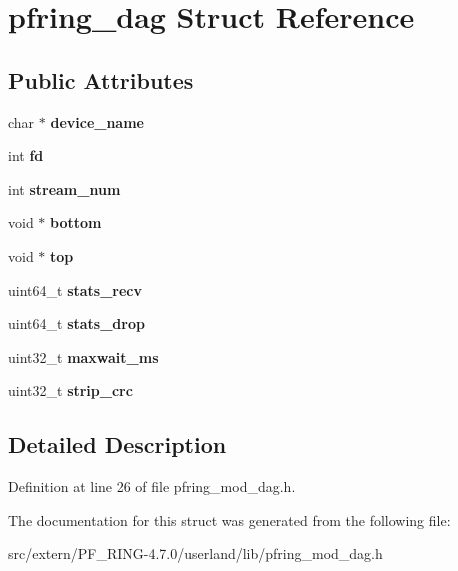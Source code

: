 \hypertarget{structpfring__dag}{
\section{pfring\_\-dag Struct Reference}
\label{structpfring__dag}
}
\subsection*{Public Attributes}
\begin{DoxyCompactItemize}
\item 
\hypertarget{structpfring__dag_aec3de53d9d51010e15cd34fb35ef5f18}{
char $\ast$ {\bfseries device\_\-name}}
\label{structpfring__dag_aec3de53d9d51010e15cd34fb35ef5f18}

\item 
\hypertarget{structpfring__dag_af1bf5f69912c3633f2c62aaaa3fca682}{
int {\bfseries fd}}
\label{structpfring__dag_af1bf5f69912c3633f2c62aaaa3fca682}

\item 
\hypertarget{structpfring__dag_a6955c1d5f98c3b8aa02f37fe305fd8a4}{
int {\bfseries stream\_\-num}}
\label{structpfring__dag_a6955c1d5f98c3b8aa02f37fe305fd8a4}

\item 
\hypertarget{structpfring__dag_a2642f03b589045afadccf186f75f7b6d}{
void $\ast$ {\bfseries bottom}}
\label{structpfring__dag_a2642f03b589045afadccf186f75f7b6d}

\item 
\hypertarget{structpfring__dag_a1cc308ad794ac2c6436f11b2a731f02e}{
void $\ast$ {\bfseries top}}
\label{structpfring__dag_a1cc308ad794ac2c6436f11b2a731f02e}

\item 
\hypertarget{structpfring__dag_af83ba3c6646a33560e5591a1cbc5e2d4}{
uint64\_\-t {\bfseries stats\_\-recv}}
\label{structpfring__dag_af83ba3c6646a33560e5591a1cbc5e2d4}

\item 
\hypertarget{structpfring__dag_aadde3e950a050e564834eb341acbba69}{
uint64\_\-t {\bfseries stats\_\-drop}}
\label{structpfring__dag_aadde3e950a050e564834eb341acbba69}

\item 
\hypertarget{structpfring__dag_abc918ef806fbdea83010cc39b33ad928}{
uint32\_\-t {\bfseries maxwait\_\-ms}}
\label{structpfring__dag_abc918ef806fbdea83010cc39b33ad928}

\item 
\hypertarget{structpfring__dag_a93345466cbe3b8658194f3abb38212c7}{
uint32\_\-t {\bfseries strip\_\-crc}}
\label{structpfring__dag_a93345466cbe3b8658194f3abb38212c7}

\end{DoxyCompactItemize}


\subsection{Detailed Description}


Definition at line 26 of file pfring\_\-mod\_\-dag.h.



The documentation for this struct was generated from the following file:\begin{DoxyCompactItemize}
\item 
src/extern/PF\_\-RING-\/4.7.0/userland/lib/pfring\_\-mod\_\-dag.h\end{DoxyCompactItemize}
